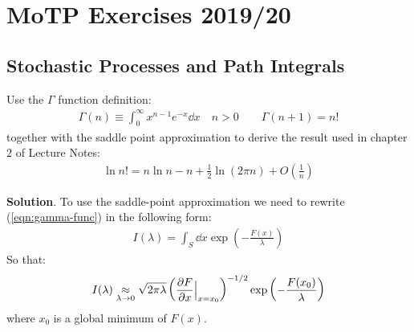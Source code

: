 \documentclass[../template.tex]{subfiles}
\begin{document}
\chapter{MoTP Exercises 2019/20}
\section{Stochastic Processes and Path Integrals}

\begin{exo}
    Use the $\Gamma$ function definition:
    \begin{align}
        \Gamma(n) \equiv \int_0^\infty x^{n-1} e^{-x} \dd{x} \quad n > 0\qquad \Gamma(n+1) = n! \label{eqn:gamma-func}
    \end{align}
    together with the saddle point approximation to derive the result used in chapter $2$ of Lecture Notes:
    \begin{align}
        \ln n! = n\ln n - n + \frac{1}{2} \ln(2 \pi n) + O\left(\frac{1}{n} \right) \label{eqn:stirling}
    \end{align} 

    \medskip

    \textbf{Solution}. To use the saddle-point approximation we need to rewrite (\ref{eqn:gamma-func}) in the following form:
    \begin{align}
        I(\lambda) = \int_S \dd{x} \exp\left(-\frac{F(x)}{\lambda} \right)
    \end{align}
    So that:
    \begin{align}
        I(\lambda) \underset{\lambda \to 0}{\approx}  \sqrt{2 \pi \lambda} \left(\pdv{F}{x} (x) \Big|_{x=x_0}\right)^{-1/2} \exp\left(-\frac{F(x_0)}{\lambda} \right)
        \label{eqn:saddle-formula}
    \end{align}
    where $x_0$ is a global minimum of $F(x)$.  


\end{exo}
\end{document}
